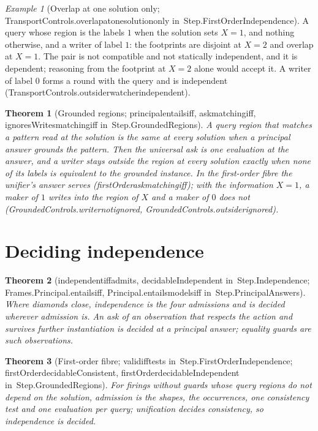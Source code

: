\documentclass[11pt]{article}
\newtheorem{theorem}{Theorem}
\theoremstyle{remark}
\newtheorem{example}{Example}
\newcommand{\lean}[1]{{\ttfamily\def\_{\textunderscore\allowbreak}#1}}
\newcommand{\inmod}[1]{in~{\ttfamily\def\_{\textunderscore\allowbreak}#1}}
\begin{document}
\begin{example}[Overlap at one solution only; \lean{TransportControls.overlap\_at\_one\_solution\_only} \inmod{Step.FirstOrderIndependence}]
A query whose region is the labels $1$ when the solution sets $X=1$, and nothing otherwise, and a writer of
label $1$: the footprints are disjoint at $X=2$ and overlap at $X=1$. The pair is not compatible and not
statically independent, and it is dependent; reasoning from the footprint at $X=2$ alone would accept it.
A writer of label $0$ forms a round with the query and is independent
(\lean{TransportControls.outsider\_watcher\_independent}).
\end{example}

\begin{theorem}[Grounded regions; \lean{principal\_entails\_iff}, \lean{ask\_matching\_iff}, \lean{ignoresWrites\_matching\_iff} \inmod{Step.GroundedRegions}]
A query region that matches a pattern read at the solution is the same at every solution when a principal
answer grounds the pattern. Then the universal ask is one evaluation at the answer, and a writer stays
outside the region at every solution exactly when none of its labels is equivalent to the grounded
instance. In the first-order fibre the unifier's answer serves (\lean{firstOrder\_ask\_matching\_iff});
with the information $X=1$, a maker of $1$ writes into the region of $X$ and a maker of $0$ does not
(\lean{GroundedControls.writer\_not\_ignored}, \lean{GroundedControls.outsider\_ignored}).
\end{theorem}

\section{Deciding independence}

\begin{theorem}[\lean{independent\_iff\_admits}, \lean{decidableIndependent} \inmod{Step.Independence}; \lean{Frames.Principal.entails\_iff}, \lean{Principal.entails\_models\_iff} \inmod{Step.PrincipalAnswers}]
Where diamonds close, independence is the four admissions and is decided wherever admission is. An ask
of an observation that respects the action and survives further instantiation is decided at a principal
answer; equality guards are such observations.
\end{theorem}

\begin{theorem}[First-order fibre; \lean{valid\_iff\_tests} \inmod{Step.FirstOrderIndependence}; \lean{firstOrder\_decidableConsistent}, \lean{firstOrder\_decidableIndependent} \inmod{Step.GroundedRegions}]
For firings without guards whose query regions do not depend on the solution, admission is the shapes,
the occurrences, one consistency test and one evaluation per query; unification decides consistency, so
independence is decided.
\end{theorem}
\end{document}
